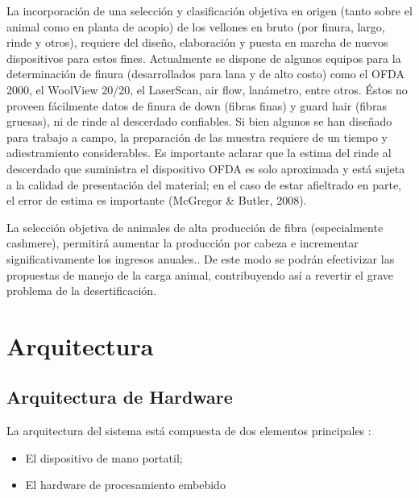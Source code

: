 \documentclass[runningheads,a4paper]{llncs}
\begin{document}
La incorporación de una selección y clasificación objetiva en origen (tanto sobre el animal como en planta de acopio) de los vellones en bruto (por finura, largo, rinde y otros), requiere del diseño, elaboración y puesta en marcha de nuevos dispositivos para estos fines. Actualmente se dispone de algunos equipos para la determinación de finura (desarrollados para lana y de alto costo) como el OFDA 2000, el WoolView 20/20, el LaserScan, air flow, lanámetro, entre otros. Éstos no proveen fácilmente datos de finura de down (fibras finas) y guard hair (fibras gruesas), ni de rinde al descerdado confiables. Si bien algunos se han diseñado para trabajo a campo, la preparación de las muestra requiere de un tiempo y adiestramiento considerables. Es importante aclarar que la estima del rinde al descerdado que suministra el dispositivo OFDA es solo aproximada y está sujeta a la calidad de presentación del material; en el caso de estar afieltrado en parte, el error de estima es importante (McGregor \& Butler, 2008).

La selección objetiva de animales de alta producción de fibra (especialmente cashmere), permitirá aumentar la producción por cabeza e incrementar significativamente los ingresos anuales.. De este modo se podrán efectivizar las propuestas de manejo de la carga animal, contribuyendo así a revertir  el grave problema de la desertificación.


\section{Arquitectura}

\subsection{Arquitectura de Hardware}

La arquitectura del sistema está compuesta de dos elementos principales :
\begin{itemize}
\item El dispositivo de mano portatil;
\item El hardware de procesamiento embebido
\end{itemize}
\end{document}
